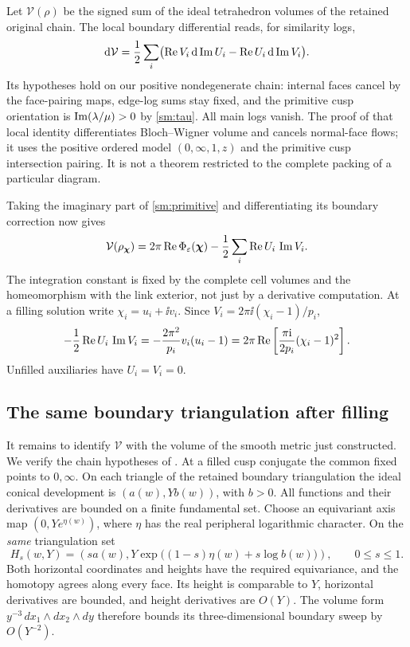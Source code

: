 Let $\mathcal V(\rho)$ be the signed sum of the ideal tetrahedron
volumes of the retained original chain. The local boundary
differential \cite[equation~(7.3)]{Marked} reads, for similarity logs,
\begin{equation}\label{sm:volume-differential}
 \mathrm d\mathcal V
     =\frac12\sum_i\bigl(\operatorname{Re} V_i\,\mathrm d\operatorname{Im} U_i
                          -\operatorname{Re} U_i\,\mathrm d\operatorname{Im} V_i\bigr).
\end{equation}
Its hypotheses hold on our positive nondegenerate chain:
internal faces cancel by the face-pairing maps, edge-log sums stay fixed,
and the primitive cusp orientation is
$\operatorname{Im}(\lambda/\mu)>0$ by \eqref{sm:tau}.
All main logs vanish. The proof of that local identity differentiates
Bloch--Wigner volume and cancels normal-face flows; it uses the
positive ordered model $(0,\infty,1,z)$ and the primitive cusp
intersection pairing. It is not a theorem restricted to the
complete packing of a particular diagram.

Taking the imaginary part of \eqref{sm:primitive} and differentiating
its boundary correction now gives
\begin{equation}\label{sm:regulator}
 \mathcal V(\rho_{\boldsymbol\chi})
      =2\pi\operatorname{Re}\Phi_\varepsilon(\boldsymbol\chi)
                     -\frac12\sum_i\operatorname{Re} U_i\,\operatorname{Im} V_i .
\end{equation}
The integration constant is fixed by the complete cell volumes and the homeomorphism with the link exterior, not just by a derivative computation.
At a filling solution write $\chi_i=u_i+\ii v_i$. Since
$V_i=2\pi\ii(\chi_i-1)/p_i$,
\begin{equation}\label{sm:boundary-term}
 -\frac12\operatorname{Re} U_i\,\operatorname{Im} V_i
    =-\frac{2\pi^2}{p_i}v_i(u_i-1)
    =2\pi\operatorname{Re}\left[\frac{\pi\mathrm i}{2p_i}(\chi_i-1)^2\right].
\end{equation}
Unfilled auxiliaries have $U_i=V_i=0$.

\subsection{The same boundary triangulation after filling}
It remains to identify $\mathcal V$ with the volume of the smooth
metric just constructed. We verify the chain hypotheses of
\cite[Section~7.3]{Marked}. At a filled cusp conjugate the common
fixed points to $0,\infty$. On each triangle of the retained
boundary triangulation the ideal conical development is
$(a(w),Yb(w))$, with $b>0$. All functions and their derivatives
are bounded on a finite fundamental set. Choose an equivariant
axis map $(0,Y e^{\eta(w)})$, where $\eta$ has the real peripheral
logarithmic character. On the \emph{same} triangulation set
\begin{equation}\label{sm:chain-homotopy}
 H_s(w,Y)=\left(sa(w),
      Y\exp\bigl((1-s)\eta(w)+s\log b(w)\bigr)\right),
                  \qquad 0\le s\le1.
\end{equation}
Both horizontal coordinates and heights have the required
equivariance, and the homotopy agrees along every face.
Its height is comparable to $Y$, horizontal derivatives are bounded,
and height derivatives are $O(Y)$. The volume form
$y^{-3}\,dx_1\wedge dx_2\wedge dy$ therefore bounds its
three-dimensional boundary sweep by $O(Y^{-2})$.

